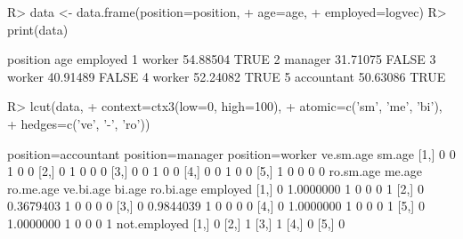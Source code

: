\begin{Schunk}
% --begin: "lcut.data.frame"
\begin{Sinput}
R> data <- data.frame(position=position,
+                     age=age,
+                     employed=logvec)
R> print(data)
\end{Sinput}
\begin{Soutput}
    position      age employed
1     worker 54.88504     TRUE
2    manager 31.71075    FALSE
3     worker 40.91489    FALSE
4     worker 52.24082     TRUE
5 accountant 50.63086     TRUE
\end{Soutput}
\begin{Sinput}
R> lcut(data,
+       context=ctx3(low=0, high=100),
+       atomic=c('sm', 'me', 'bi'),
+       hedges=c('ve', '-', 'ro'))
\end{Sinput}
\begin{Soutput}
     position=accountant position=manager position=worker ve.sm.age sm.age
[1,]                   0                0               1         0      0
[2,]                   0                1               0         0      0
[3,]                   0                0               1         0      0
[4,]                   0                0               1         0      0
[5,]                   1                0               0         0      0
     ro.sm.age    me.age ro.me.age ve.bi.age bi.age ro.bi.age employed
[1,]         0 1.0000000         1         0      0         0        1
[2,]         0 0.3679403         1         0      0         0        0
[3,]         0 0.9844039         1         0      0         0        0
[4,]         0 1.0000000         1         0      0         0        1
[5,]         0 1.0000000         1         0      0         0        1
     not.employed
[1,]            0
[2,]            1
[3,]            1
[4,]            0
[5,]            0
\end{Soutput}
%
% --end: "lcut.data.frame"
\end{Schunk}
